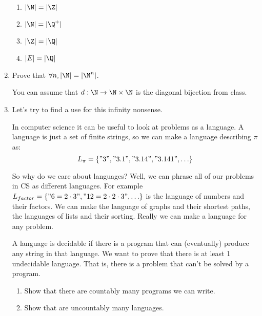 \documentclass[basic, header]{nosvagor-notes}
\begin{document}
\begin{enumerate}[itemsep=4em]
\begin{enumerate}[leftmargin=2em]
      \item \(\displaystyle |\N| = |\Z| \)

      \item \(\displaystyle |\N| = |\Q^+| \)

      \item \(\displaystyle |\Z| = |\Q| \)

      \item \(\displaystyle |E| = |\Q| \)

    \end{enumerate}

  \newpage %

  \item Prove that \(\displaystyle \forall n, |\N| = |\N^n|\).

    You can assume that \(d : \N \to \N \times \N\) is the diagonal bijection
    from class.

  \newpage %

  \item Let's try to find a use for this infinity nonsense.

    In computer science it can be useful to look at problems as a language. A
    language is just a set of finite strings, so we can make a language
    describing $\pi$ as: \[L_\pi = \{"3", "3.1", "3.14", "3.141", \ldots\}\]

    So why do we care about languages?
    Well, we can phrase all of our problems in CS as different languages.
    For example $L_{factor} = \{"6=2\cdot3", "12=2\cdot2\cdot3", \ldots\}$
    is the language of numbers and their factors. We can make the language of
    graphs and their shortest paths, the languages of lists
    and their sorting. Really we can make a language for any problem.

    A language is decidable if there is a program that can (eventually)
    produce any string in that language. We want to prove that there is at
    least 1 undecidable language. That is, there is a problem that can’t be
    solved by a program.

    \begin{enumerate}[leftmargin=2em]

      \item Show that there are countably many programs we can write.

      \item Show that are uncountably many languages.


\end{enumerate}
\end{enumerate}
\end{document}
